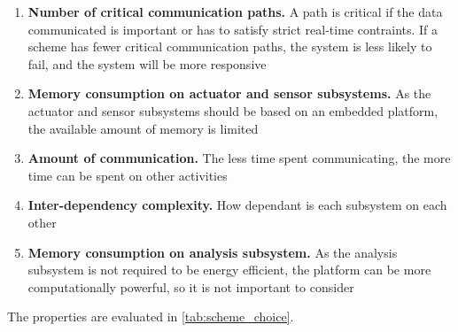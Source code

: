\begin{enumerate}
\item \textbf{Number of critical communication paths.} A path is critical if the data communicated is important or has to satisfy strict real-time contraints. If a scheme has fewer critical communication paths, the system is less likely to fail, and the system will be more responsive
\item \textbf{Memory consumption on actuator and sensor subsystems.} As the actuator and sensor subsystems should be based on an embedded platform, the available amount of memory is limited
\item \textbf{Amount of communication.} The less time spent communicating, the more time can be spent on other activities
\item \textbf{Inter-dependency complexity.} How dependant is each subsystem on each other
\item \textbf{Memory consumption on analysis subsystem.} As the analysis subsystem is not required to be energy efficient, the platform can be more computationally powerful, so it is not important to consider
\end{enumerate}

The properties are evaluated in \cref{tab:scheme_choice}.

